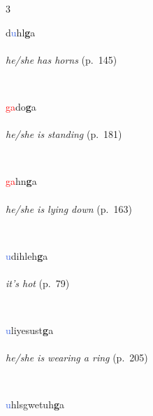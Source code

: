 \documentclass[oneside,openany]{book}%
\begin{document}
\noindent\begin{multicols}{3}%
\begin{minipage}[t]{\linewidth}
\raggedright\noindent d\textcolor{RoyalBlue}{u}hl\textbf{g}a\\
\\
\noindent \textit{he/she has horns} (p.~145)
\end{minipage}\\[1em]%
\begin{minipage}[t]{\linewidth}
\raggedright\noindent \textcolor{Red}{ga}do\textbf{g}a\\
\\
\noindent \textit{he/she is standing} (p.~181)
\end{minipage}\\[1em]%
\begin{minipage}[t]{\linewidth}
\raggedright\noindent \textcolor{Red}{ga}hn\textbf{g}a\\
\\
\noindent \textit{he/she is lying down} (p.~163)
\end{minipage}\\[1em]%
\begin{minipage}[t]{\linewidth}
\raggedright\noindent \textcolor{RoyalBlue}{u}dihleh\textbf{g}a\\
\\
\noindent \textit{it's hot} (p.~79)
\end{minipage}\\[1em]%
\begin{minipage}[t]{\linewidth}
\raggedright\noindent \textcolor{RoyalBlue}{u}liyesust\textbf{g}a\\
\\
\noindent \textit{he/she is wearing a ring} (p.~205)
\end{minipage}\\[1em]%
\begin{minipage}[t]{\linewidth}
\raggedright\noindent \textcolor{RoyalBlue}{u}hlsgwetuh\textbf{g}a\\
\\

\end{minipage}
\end{multicols}
\end{document}

